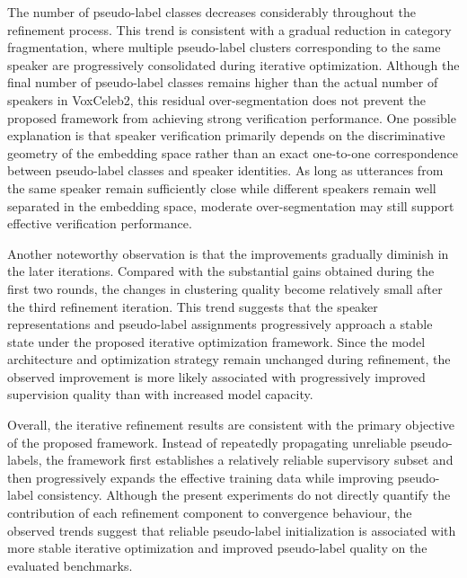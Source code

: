 \documentclass[lettersize,journal]{IEEEtran}
\begin{document}
The number of pseudo-label classes decreases considerably throughout the refinement process. This trend is consistent with a gradual reduction in category fragmentation, where multiple pseudo-label clusters corresponding to the same speaker are progressively consolidated during iterative optimization. Although the final number of pseudo-label classes remains higher than the actual number of speakers in VoxCeleb2, this residual over-segmentation does not prevent the proposed framework from achieving strong verification performance. One possible explanation is that speaker verification primarily depends on the discriminative geometry of the embedding space rather than an exact one-to-one correspondence between pseudo-label classes and speaker identities. As long as utterances from the same speaker remain sufficiently close while different speakers remain well separated in the embedding space, moderate over-segmentation may still support effective verification performance.

Another noteworthy observation is that the improvements gradually diminish in the later iterations. Compared with the substantial gains obtained during the first two rounds, the changes in clustering quality become relatively small after the third refinement iteration. This trend suggests that the speaker representations and pseudo-label assignments progressively approach a stable state under the proposed iterative optimization framework. Since the model architecture and optimization strategy remain unchanged during refinement, the observed improvement is more likely associated with progressively improved supervision quality than with increased model capacity.

Overall, the iterative refinement results are consistent with the primary objective of the proposed framework. Instead of repeatedly propagating unreliable pseudo-labels, the framework first establishes a relatively reliable supervisory subset and then progressively expands the effective training data while improving pseudo-label consistency. Although the present experiments do not directly quantify the contribution of each refinement component to convergence behaviour, the observed trends suggest that reliable pseudo-label initialization is associated with more stable iterative optimization and improved pseudo-label quality on the evaluated benchmarks.
\end{document}
